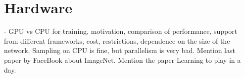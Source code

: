 \section{Hardware}


- GPU vs CPU for training, motivation, comparison of performance, support
  from different frameworks, cost, restrictions, dependence on the size of
  the network. Sampling on CPU is fine, but parallelism is very bad.
  Mention last paper by FaceBook about ImageNet. Mention the paper Learning
  to play in a day.
